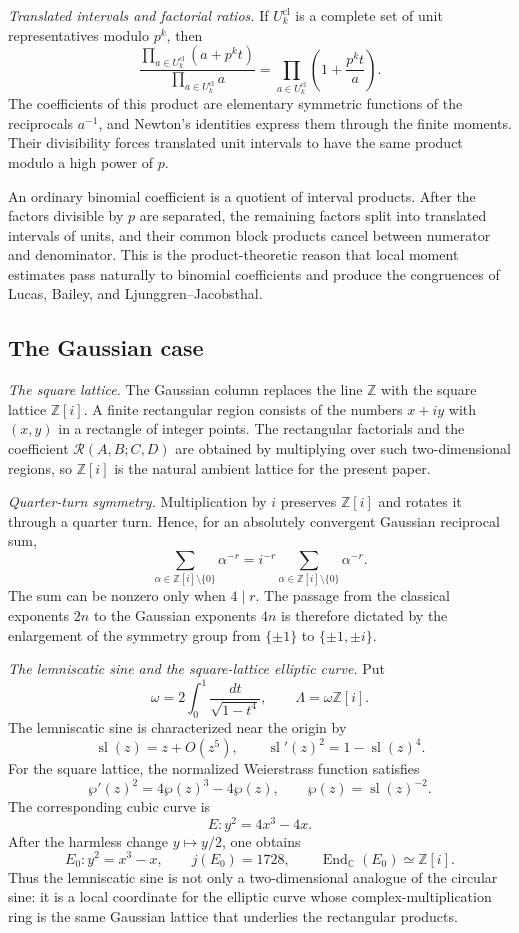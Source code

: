 \documentclass[a4paper,american,11pt]{amsart}
\numberwithin{equation}{section}
\theoremstyle{definition}
\newcommand{\Z}{\mathbb Z}
\newcommand{\Rect}{\mathcal R}
\DeclareMathOperator{\slf}{sl}
\begin{document}
\emph{Translated intervals and factorial ratios.}
If $U_k^{\mathrm{cl}}$ is a complete set of unit representatives modulo $p^k$, then
\[
\frac{\prod_{a\in U_k^{\mathrm{cl}}}(a+p^kt)}
{\prod_{a\in U_k^{\mathrm{cl}}}a}
=
\prod_{a\in U_k^{\mathrm{cl}}}
\left(1+\frac{p^kt}{a}\right).
\]
The coefficients of this product are elementary symmetric functions of the reciprocals $a^{-1}$, and Newton's identities express them through the finite moments. Their divisibility forces translated unit intervals to have the same product modulo a high power of $p$.

An ordinary binomial coefficient is a quotient of interval products. After the factors divisible by $p$ are separated, the remaining factors split into translated intervals of units, and their common block products cancel between numerator and denominator. This is the product-theoretic reason that local moment estimates pass naturally to binomial coefficients and produce the congruences of Lucas, Bailey, and Ljunggren--Jacobsthal.

\subsection{The Gaussian case}\label{subsec:gaussian-column}

\emph{The square lattice.}
The Gaussian column replaces the line $\Z$ with the square lattice $\Z[i]$. A finite rectangular region consists of the numbers $x+iy$ with $(x,y)$ in a rectangle of integer points. The rectangular factorials and the coefficient $\Rect(A,B;C,D)$ are obtained by multiplying over such two-dimensional regions, so $\Z[i]$ is the natural ambient lattice for the present paper.

\emph{Quarter-turn symmetry.}
Multiplication by $i$ preserves $\Z[i]$ and rotates it through a quarter turn. Hence, for an absolutely convergent Gaussian reciprocal sum,
\[
\sum_{\alpha\in\Z[i]\setminus\{0\}}\alpha^{-r}
=
i^{-r}\sum_{\alpha\in\Z[i]\setminus\{0\}}\alpha^{-r}.
\]
The sum can be nonzero only when $4\mid r$. The passage from the classical exponents $2n$ to the Gaussian exponents $4n$ is therefore dictated by the enlargement of the symmetry group from $\{\pm1\}$ to $\{\pm1,\pm i\}$.

\emph{The lemniscatic sine and the square-lattice elliptic curve.}
Put
\[
\omega=2\int_0^1\frac{dt}{\sqrt{1-t^4}},
\qquad
\Lambda=\omega\Z[i].
\]
The lemniscatic sine is characterized near the origin by
\[
\slf(z)=z+O(z^5),
\qquad
\slf'(z)^2=1-\slf(z)^4.
\]
For the square lattice, the normalized Weierstrass function satisfies
\[
\wp'(z)^2=4\wp(z)^3-4\wp(z),
\qquad
\wp(z)=\slf(z)^{-2}.
\]
The corresponding cubic curve is
\[
E:y^2=4x^3-4x.
\]
After the harmless change $y\mapsto y/2$, one obtains
\[
E_0:y^2=x^3-x,
\qquad
j(E_0)=1728,
\qquad
\operatorname{End}_{\mathbb C}(E_0)\simeq\Z[i].
\]
Thus the lemniscatic sine is not only a two-dimensional analogue of the circular sine: it is a local coordinate for the elliptic curve whose complex-multiplication ring is the same Gaussian lattice that underlies the rectangular products.
\end{document}
